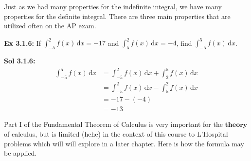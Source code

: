 Just as we had many properties for the indefinite integral, we have many properties for the definite integral. There are three main properties that are utilized often on the AP exam. \par

\begin{center}
\end{center}

\begin{tcolorbox}[example]
    \textbf{Ex 3.1.6: } If $\int_{-5}^2 f(x) \,\mathrm{d}x = -17$ and $\int_5^2 f(x) \,\mathrm{d}x = -4$, find $\int_{-5}^5 f(x) \,\mathrm{d}x$.
\end{tcolorbox}
\begin{tcolorbox}[solution]
    \textbf{Sol 3.1.6: } \begin{align*}
        \int_{-5}^5 f(x) \,\mathrm{d}x &= \int_{-5}^2 f(x) \,\mathrm{d}x + \int_2^5 f(x) \,\mathrm{d}x \\[11pt]
        & = \int_{-5}^2 f(x) \,\mathrm{d}x - \int_5^2 f(x) \,\mathrm{d}x \\[11pt]
        & = -17 - (-4) \\[11pt]
        & = \boxed{-13}
    \end{align*}
\end{tcolorbox}

Part I of the Fundamental Theorem of Calculus is very important for the $\textbf{theory}$ of calculus, but is limited (hehe) in the context of this course to L'Hospital problems which will will explore in a later chapter. Here is how the formula may be applied. \par

